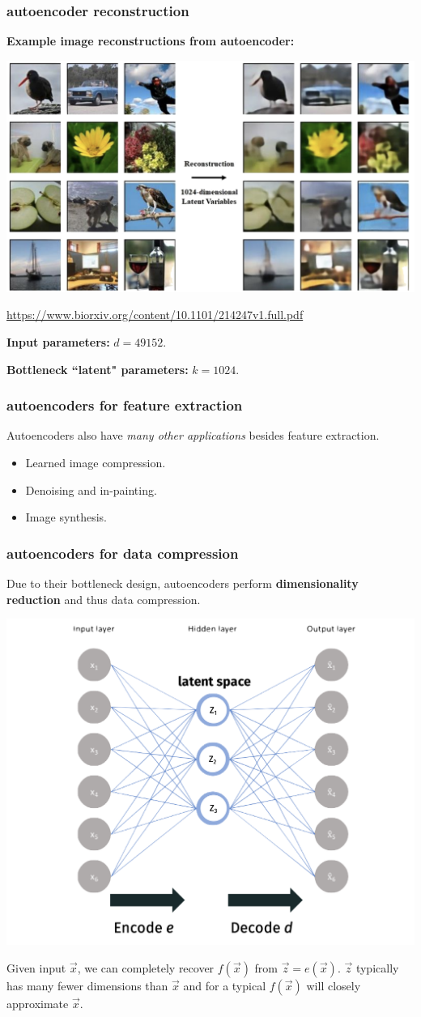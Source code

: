 \documentclass[handout,compress]{beamer}
\begin{document}
\begin{frame}
	\frametitle{autoencoder reconstruction}\small
	\textbf{Example image reconstructions from autoencoder:}
	\begin{center}
		\includegraphics[width=.8\textwidth]{reconstruction.png}
		
		\tiny{\url{https://www.biorxiv.org/content/10.1101/214247v1.full.pdf}}
	\end{center}
	\textbf{Input parameters:} $d = 49152$.\vspace{-.5em}
	
	\textbf{Bottleneck ``latent" parameters:} $k = 1024$.  
\end{frame}


\begin{frame}
	\frametitle{autoencoders for feature extraction}
	Autoencoders also have \emph{many other applications} besides feature extraction.
	\begin{itemize}
		\item Learned image compression.
		\item Denoising and in-painting.
		\item Image synthesis.
	\end{itemize}
\end{frame}

\begin{frame}
	\frametitle{autoencoders for data compression}
	Due to their bottleneck design, autoencoders perform \textbf{dimensionality reduction} and thus data compression. 
	\begin{center}
		\includegraphics[width=.5\textwidth]{labeled_bottleneck.png}
	\end{center}
Given input $\vec{x}$, we can completely recover $f(\vec{x})$ from $\vec{z} = e(\vec{x})$. $\vec{z}$ typically has many fewer dimensions than $\vec{x}$ and for a typical $f(\vec{x})$ will closely approximate $\vec{x}$.  
\end{frame}
\end{document}
